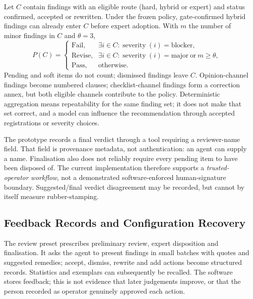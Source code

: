 Let $C$ contain findings with an eligible route (hard, hybrid or expert) and status confirmed, accepted or rewritten. Under the frozen policy, gate-confirmed hybrid findings can already enter $C$ before expert adoption. With $m$ the number of minor findings in $C$ and $\theta=3$,
\begin{equation*}
P(C)=\begin{cases}
\text{Fail},&\exists i\in C:\operatorname{severity}(i)=\text{blocker},\\
\text{Revise},&\exists i\in C:\operatorname{severity}(i)=\text{major}\ \text{or}\ m\ge\theta,\\
\text{Pass},&\text{otherwise}.
\end{cases}
\end{equation*}
Pending and soft items do not count; dismissed findings leave $C$. Opinion-channel findings become numbered clauses; checklist-channel findings form a correction annex, but both eligible channels contribute to the policy. Deterministic aggregation means repeatability for the same finding set; it does not make that set correct, and a model can influence the recommendation through accepted registrations or severity choices.

The prototype records a final verdict through a tool requiring a reviewer-name field. That field is provenance metadata, not authentication: an agent can supply a name. Finalisation also does not reliably require every pending item to have been disposed of. The current implementation therefore supports a \emph{trusted-operator workflow}, not a demonstrated software-enforced human-signature boundary. Suggested/final verdict disagreement may be recorded, but cannot by itself measure rubber-stamping.

\subsection{Feedback Records and Configuration Recovery}\label{sec:memory}\label{sec:feedback}

The review preset prescribes preliminary review, expert disposition and finalisation. It asks the agent to present findings in small batches with quotes and suggested remedies; accept, dismiss, rewrite and add actions become structured records. Statistics and exemplars can subsequently be recalled. The software stores feedback; this is not evidence that later judgements improve, or that the person recorded as operator genuinely approved each action.


